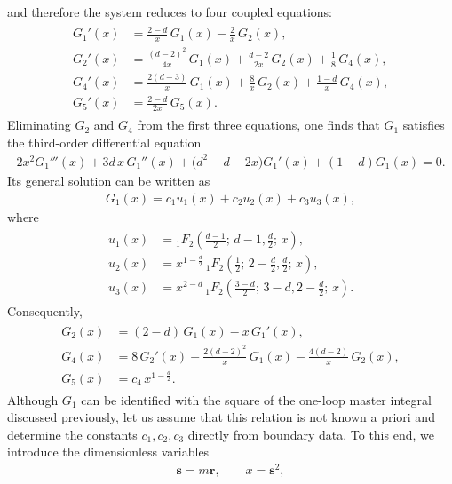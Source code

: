 and therefore the system reduces to four coupled equations:
\begin{align}
\begin{split}
G_1'(x) &= \frac{2-d}{x}\,G_1(x) - \frac{2}{x}\,G_2(x), \\
G_2'(x) &= \frac{(d-2)^2}{4x}\,G_1(x) + \frac{d-2}{2x}\,G_2(x) + \frac{1}{8}\,G_4(x), \\
G_4'(x) &= \frac{2(d-3)}{x}\,G_1(x) + \frac{8}{x}\,G_2(x) + \frac{1-d}{x}\,G_4(x), \\
G_5'(x) &= \frac{2-d}{2x}\,G_5(x).
\end{split}
\end{align}
Eliminating $G_2$ and $G_4$ from the first three equations, one finds that $G_1$ satisfies the third-order differential equation
\begin{align}
2x^2 G_1'''(x) + 3d\,x\,G_1''(x) + \bigl(d^2-d-2x\bigr) G_1'(x) + (1-d) G_1(x) = 0.
\end{align}
Its general solution can be written as
\begin{align}
G_1(x) = c_1 u_1(x) + c_2 u_2(x) + c_3 u_3(x),
\end{align}
where
\begin{align}
\begin{split}
u_1(x) &= {}_1F_2\!\left(\frac{d-1}{2};\, d-1,\frac{d}{2};\, x\right), \\
u_2(x) &= x^{1-\frac{d}{2}}\,
{}_1F_2\!\left(\frac{1}{2};\, 2-\frac{d}{2},\frac{d}{2};\, x\right), \\
u_3(x) &= x^{2-d}\,
{}_1F_2\!\left(\frac{3-d}{2};\, 3-d,2-\frac{d}{2};\, x\right).
\end{split}
\end{align}
Consequently,
\begin{align}
\begin{split}
G_2(x) &= (2-d)\,G_1(x) - x\,G_1'(x), \\
G_4(x) &= 8\,G_2'(x) - \frac{2(d-2)^2}{x}\,G_1(x) - \frac{4(d-2)}{x}\,G_2(x), \\
G_5(x) &= c_4\,x^{1-\frac{d}{2}}.
\end{split}
\end{align}
Although $G_1$ can be identified with the square of the one-loop master integral discussed previously, let us assume that this relation is not known a priori and determine the constants $c_1,c_2,c_3$ directly from boundary data. To this end, we introduce the dimensionless variables
\begin{align}
\boldsymbol{s} = m \boldsymbol{r},
\qquad
x = \boldsymbol{s}^2,
\end{align}
